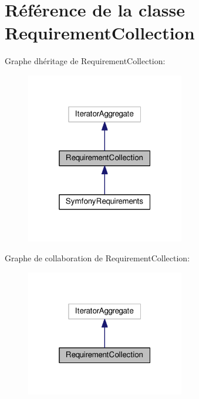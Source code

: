 \hypertarget{classRequirementCollection}{}\section{Référence de la classe Requirement\+Collection}
\label{classRequirementCollection}


Graphe d\textquotesingle{}héritage de Requirement\+Collection\+:\nopagebreak
\begin{figure}[H]
\begin{center}
\leavevmode
\includegraphics[width=196pt]{classRequirementCollection__inherit__graph}
\end{center}
\end{figure}


Graphe de collaboration de Requirement\+Collection\+:\nopagebreak
\begin{figure}[H]
\begin{center}
\leavevmode
\includegraphics[width=196pt]{classRequirementCollection__coll__graph}
\end{center}
\end{figure}
